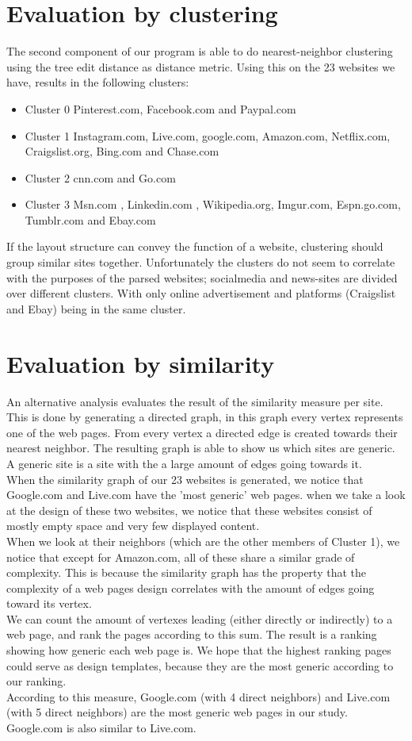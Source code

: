 \section{Evaluation by clustering}
The second component of our program is able to do nearest-neighbor clustering using the tree edit distance as distance metric. Using this on the 23 websites we have, results in the following clusters:
\begin{itemize}
\item{Cluster 0} Pinterest.com, Facebook.com and Paypal.com
\item{Cluster 1} Instagram.com, Live.com, google.com, Amazon.com, Netflix.com, Craigslist.org, Bing.com and Chase.com
\item{Cluster 2} cnn.com and Go.com
\item{Cluster 3} Msn.com , Linkedin.com , Wikipedia.org, Imgur.com, Espn.go.com, Tumblr.com and Ebay.com
\end{itemize}

If the layout structure can convey the function of a website, clustering should group similar sites together. Unfortunately the clusters do not seem to correlate with the purposes of the parsed websites; socialmedia and news-sites are divided over different clusters. With only online advertisement and platforms (Craigslist and Ebay) being in the same cluster. 

\section{Evaluation by similarity}
An alternative analysis evaluates the result of the similarity measure per site. This is done by generating a directed graph, in this graph every vertex represents one of the web pages. From every vertex a directed edge is created towards their nearest neighbor. The resulting graph is able to show us which sites are generic. A generic site is a site with the a large amount of edges going towards it.
\\When the similarity graph of our 23 websites is generated, we notice that Google.com and Live.com have the 'most generic' web pages. when we take a look at the design of these two websites, we notice that these websites consist of mostly empty space and very few displayed content.
\\When we look at their neighbors (which are the other members of Cluster 1), we notice that except for Amazon.com, all of these share a similar grade of complexity. This is because the similarity graph has the property that the complexity of a web pages design correlates with the amount of edges going toward its vertex.
\\We can count the amount of vertexes leading (either directly or indirectly) to a web page, and rank the pages according to this sum. The result is a ranking showing how generic each web page is. We hope that the highest ranking pages could serve as design templates, because they are the most generic according to our ranking.
\\According to this measure, Google.com (with 4 direct neighbors) and Live.com (with 5 direct neighbors) are the most generic web pages in our study. Google.com is also similar to Live.com.

